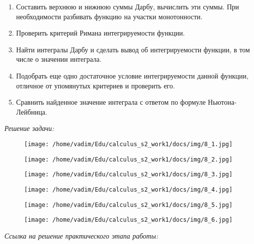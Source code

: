 \documentclass[a4paper,12pt]{article}
\begin{document}
\begin{enumerate}
    \item Составить верхнюю и нижнюю суммы Дарбу, вычислить эти суммы. При необходимости разбивать функцию на участки монотонности.
    
    \item Проверить критерий Римана интегрируемости функции.
    
    \item Найти интегралы Дарбу и сделать вывод об интегрируемости функции, в том числе о значении интеграла.
    
    \item Подобрать еще одно достаточное условие интегрируемости данной функции, отличное от упомянутых критериев и проверить его.
    
    \item Сравнить найденное значение интеграла с ответом по формуле Ньютона-Лейбница.
\end{enumerate}


\emph{Решение задачи:}

\begin{figure}[H]
    \centering
    \texttt{[image: /home/vadim/Edu/calculus\_s2\_work1/docs/img/8\_1.jpg]}
    \label{fig:integral}
\end{figure}

\begin{figure}[H]
    \centering
    \texttt{[image: /home/vadim/Edu/calculus\_s2\_work1/docs/img/8\_2.jpg]}
    \label{fig:integral}
\end{figure}

\begin{figure}[H]
    \centering
    \texttt{[image: /home/vadim/Edu/calculus\_s2\_work1/docs/img/8\_3.jpg]}
    \label{fig:integral}
\end{figure}

\begin{figure}[H]
    \centering
    \texttt{[image: /home/vadim/Edu/calculus\_s2\_work1/docs/img/8\_4.jpg]}
    \label{fig:integral}
\end{figure}

\begin{figure}[H]
    \centering
    \texttt{[image: /home/vadim/Edu/calculus\_s2\_work1/docs/img/8\_5.jpg]}
    \label{fig:integral}
\end{figure}

\begin{figure}[H]
    \centering
    \texttt{[image: /home/vadim/Edu/calculus\_s2\_work1/docs/img/8\_6.jpg]}
    \label{fig:integral}
\end{figure}

\emph{Ссылка на решение практического этапа работы:}
\
\end{document}
